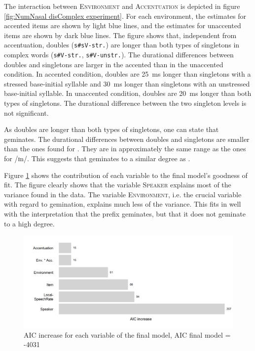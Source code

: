 The interaction between \textsc{Environment} and \textsc{Accentuation} is depicted in figure \ref{fig:NumNasal disComplex experiment}. For each environment, the estimates for accented items are shown by light blue lines, and the estimates for unaccented items are shown by dark blue lines.
The figure shows that,  
independent from accentuation, doubles (\texttt{s\#sV-str.}) are longer than both types of singletons in complex words (\texttt{s\#V-str.}, \texttt{s\#V-unstr.}). The durational differences between doubles and singletons are larger in the accented than in the unaccented condition. 
In accented condition, doubles are 25~ms longer than singletons with a stressed base-initial syllable and 30~ms longer than singletons with an unstressed base-initial syllable. 
In unaccented condition, doubles are 20~ms longer than both types of singletons. 
The durational difference between the two singleton levels is not significant.

As doubles are longer than both types of singletons, one can state that  geminates. The durational differences between doubles and singletons are smaller than the ones found for . They are in approximately the same range as the ones for /ɪn/. This suggests that  geminates to a similar degree as .



Figure \ref{fig:Effectsize dis experiment} shows the contribution of each variable to the final model's goodness of fit.
The figure clearly shows that the variable \textsc{Speaker} explains most of the variance found in the data. The variable 
\textsc{Environment}, i.e. the crucial variable with regard to gemination, explains much less of the variance. This fits in well with the interpretation that the prefix  geminates, but that it does not geminate to a high degree.


\begin{figure}[h!]
	\centering
	\includegraphics[scale=0.7]{images/Experiment/AICdecreaseDisComplex.png}
	\caption{AIC increase for each variable of the final model, AIC final model = -4031}
	\label{fig:Effectsize dis experiment}

\end{figure}



